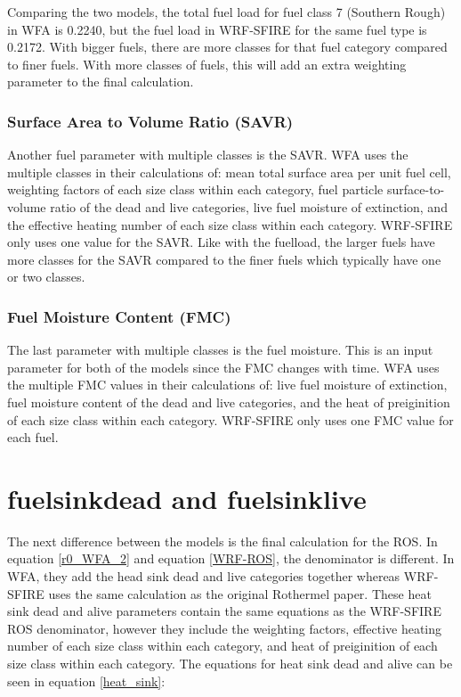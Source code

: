 \documentclass{article}
\newcommand\und{\textunderscore}
\begin{document}
 
 Comparing the two models, the total fuel load for fuel class 7 (Southern Rough) in WFA is 0.2240, but the fuel load in WRF-SFIRE for the same fuel type is 0.2172. With bigger fuels, there are more classes for that fuel category compared to finer fuels. With more classes of fuels, this will add an extra weighting parameter to the final calculation. 
 
\subsubsection{Surface Area to Volume Ratio (SAVR)}
Another fuel parameter with multiple classes is the SAVR. WFA uses the multiple classes in their calculations of: mean total surface area per unit fuel cell, weighting factors of each size class within each category, fuel particle surface-to-volume ratio of the dead and live categories, live fuel moisture of extinction, and the effective heating number of each size class within each category. WRF-SFIRE only uses one value for the SAVR. Like with the fuelload, the larger fuels have more classes for the SAVR compared to the finer fuels which typically have one or two classes. 

\subsubsection{Fuel Moisture Content (FMC)}
The last parameter with multiple classes is the fuel moisture. This is an input parameter for both of the models since the FMC changes with time. WFA uses the multiple FMC values in their calculations of: live fuel moisture of extinction, fuel moisture content of the dead and live categories, and the heat of preiginition of each size class within each category. WRF-SFIRE only uses one FMC value for each fuel. 

\section{fuel\und sink\und dead and fuel\und sink\und live}
The next difference between the models is the final calculation for the ROS. In equation \ref{r0_WFA_2} and equation \ref{WRF-ROS}, the denominator is different. In WFA, they add the head sink dead and live categories together whereas WRF-SFIRE uses the same calculation as the original Rothermel paper. These heat sink dead and alive parameters contain the same equations as the WRF-SFIRE ROS denominator, however they include the weighting factors, effective heating number of each size class within each category, and heat of preiginition of each size class within each category. The equations for heat sink dead and alive can be seen in equation \ref{heat_sink}:
\end{document}
